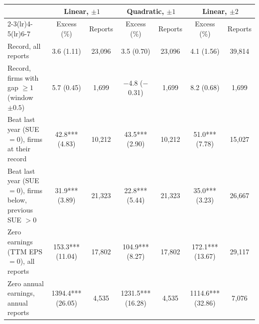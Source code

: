 \begin{tabular}{lcccccc}
\toprule
 & \multicolumn{2}{c}{Linear, $\pm1$} & \multicolumn{2}{c}{Quadratic, $\pm1$} & \multicolumn{2}{c}{Linear, $\pm2$}\\
\cmidrule(lr){2-3}\cmidrule(lr){4-5}\cmidrule(lr){6-7}
 & Excess (\%) & Reports & Excess (\%) & Reports & Excess (\%) & Reports\\
\midrule
Record, all reports & 3.6 (1.11) & 23,096 & 3.5 (0.70) & 23,096 & 4.1 (1.56) & 39,814\\
Record, firms with gap $\geq1$ (window $\pm0.5$) & 5.7 (0.45) & 1,699 & \ensuremath{-}4.8 (\ensuremath{-}0.31) & 1,699 & 8.2 (0.68) & 1,699\\
Beat last year (SUE $=0$), firms at their record & 42.8*** (4.83) & 10,212 & 43.5*** (2.90) & 10,212 & 51.0*** (7.78) & 15,027\\
Beat last year (SUE $=0$), firms below, previous SUE $>0$ & 31.9*** (3.89) & 21,323 & 22.8*** (5.44) & 21,323 & 35.0*** (3.23) & 26,667\\
Zero earnings (TTM EPS $=0$), all reports & 153.3*** (11.04) & 17,802 & 104.9*** (8.27) & 17,802 & 172.1*** (13.67) & 29,117\\
Zero annual earnings, annual reports & 1394.4*** (26.05) & 4,535 & 1231.5*** (16.28) & 4,535 & 1114.6*** (32.86) & 7,076\\
\bottomrule
\end{tabular}
